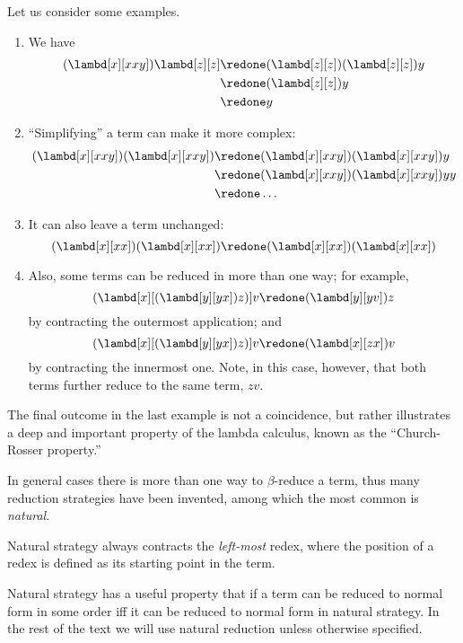 \documentclass[../../../include/open-logic-section]{subfiles}
\begin{document}
Let us consider some examples.
\begin{enumerate}
\item We have
\begin{align*}
(\lambd[x][xxy]) \lambd[z][z] & \redone (\lambd[z][z])(\lambd[z][z]) y \\
& \redone (\lambd[z][z]) y \\
& \redone y
\end{align*}
\item ``Simplifying'' a term can make it more complex:
\begin{align*}
(\lambd[x][xxy])(\lambd[x][xxy]) & \redone (\lambd[x][xxy])(\lambd[x][xxy])y \\
& \redone (\lambd[x][xxy])(\lambd[x][xxy])yy \\
& \redone \dots
\end{align*}
\item It can also leave a term unchanged:
\[
(\lambd[x][xx])(\lambd[x][xx]) \redone (\lambd[x][xx])(\lambd[x][xx])
\]
\item Also, some terms can be reduced in more than one way; for
  example,
\[
(\lambd[x][(\lambd[y][yx]) z)] v \redone (\lambd[y][yv]) z
\]
by contracting the outermost application; and
\[
(\lambd[x][(\lambd[y][yx]) z)] v \redone (\lambd[x][zx]) v
\]
by contracting the innermost one. Note, in this case, however, that
both terms further reduce to the same term, $zv$.
\end{enumerate}

The final outcome in the last example is not a coincidence, but rather
illustrates a deep and important property of the lambda calculus, known as the
``Church-Rosser property.''

\begin{digress}
  In general cases there is more than one way to $\beta$-reduce a
  term, thus many reduction strategies have been invented, among which
  the most common is \emph{natural}.
  
  Natural strategy always contracts the \emph{left-most}
  redex, where the position of a redex is defined as its starting
  point in the term.

  Natural strategy has a useful property that if a term can be reduced
  to normal form in some order iff it can be reduced to normal form in
  natural strategy. In the rest of the text we will use natural
  reduction unless otherwise specified. 
\end{digress}
\end{document}
